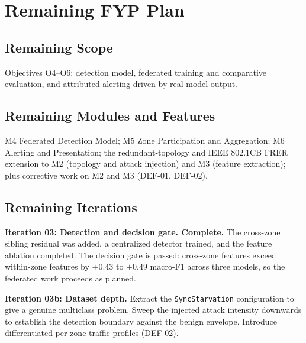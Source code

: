 \chapter{Remaining FYP Plan}
\label{ch:plan}

\section{Remaining Scope}
Objectives O4--O6: detection model, federated training and comparative evaluation,
and attributed alerting driven by real model output.

\section{Remaining Modules and Features}
M4 Federated Detection Model; M5 Zone Participation and Aggregation; M6 Alerting and
Presentation; the redundant-topology and IEEE 802.1CB FRER extension to M2 (topology
and attack injection) and M3 (feature extraction); plus corrective work on M2 and M3
(DEF-01, DEF-02).

\section{Remaining Iterations}
\label{sec:remaining-iterations}

\textbf{Iteration 03: Detection and decision gate. Complete.}
The cross-zone sibling residual was added, a centralized detector trained, and the
feature ablation completed. The decision gate is passed: cross-zone features exceed
within-zone features by $+0.43$ to $+0.49$ macro-F1 across three models, so the
federated work proceeds as planned.

\textbf{Iteration 03b: Dataset depth.}
Extract the \texttt{SyncStarvation} configuration to give a genuine multiclass problem.
Sweep the injected attack intensity downwards to establish the detection boundary
against the benign envelope. Introduce differentiated per-zone traffic profiles
(DEF-02).

